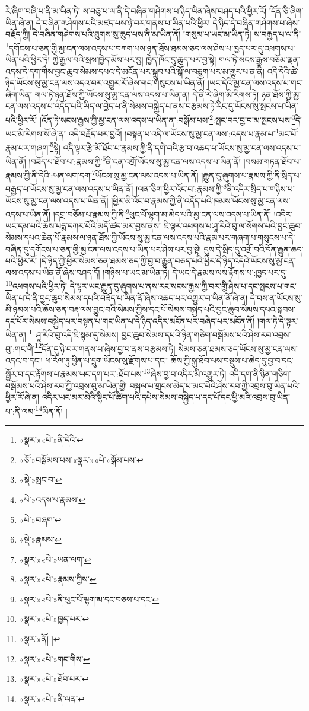 རེ་ཞིག་བཞི་པ་ནི་མ་ཡིན་ཏེ། ས་བཅུ་པ་ལ་ནི་དེ་བཞིན་གཤེགས་པ་ཉིད་ཡིན་ཞེས་བཤད་པའི་ཕྱིར་རོ། །དོན་ཅི་ཞིག་ཡིན་ཞེ་ན། དེ་བཞིན་གཤེགས་པའི་མཛད་པས་ཉེ་བར་གནས་པ་ཡིན་པའི་ཕྱིར། དེ་ཉིད་དེ་བཞིན་གཤེགས་པ་ཞེས་བརྗོད་ཀྱི། དེ་བཞིན་གཤེགས་པའི་ཐུགས་སུ་ཆུད་པས་ནི་མ་ཡིན་ནོ། །གསུམ་པ་ཡང་མ་ཡིན་ཏེ། ས་བརྒྱད་པ་ལ་ནི་\footnote{«སྣར་»«པེ་»ནི་དེའི་}དགོངས་པ་ཅན་གྱི་མྱ་ངན་ལས་འདས་པ་བཀག་པས་ཉན་ཐོས་ཐམས་ཅད་ལས་ཤེས་པ་ཁྱད་པར་དུ་འཕགས་པ་ཡིན་པའི་ཕྱིར་ཏེ། ཀྱེ་རྒྱལ་བའི་སྲས་ཁྱེད་མོས་པར་བྱ། ཁྱེད་ཁོང་དུ་ཆུད་པར་བྱ་སྟེ། གལ་ཏེ་སངས་རྒྱས་བཅོམ་ལྡན་འདས་དེ་དག་གིས་བྱང་ཆུབ་སེམས་དཔའ་དེ་མངོན་པར་སྒྲུབ་པའི་སྒོ་ལ་བཅུག་པར་མ་གྱུར་པ་ན་ནི། འདི་དེའི་ཚེ་ཉིད་ཡོངས་སུ་མྱ་ངན་ལས་འདའ་བར་འགྱུར་རོ་ཞེས་གང་གསུངས་པ་ཡིན་ནོ། །ཡང་དེའི་མྱ་ངན་ལས་འདས་པ་གང་ཞིག་ཡིན། གལ་ཏེ་ཉན་ཐོས་ཀྱི་ཡོངས་སུ་མྱ་ངན་ལས་འདས་པ་ཡིན་ན། དེ་ནི་རེ་ཞིག་མི་རིགས་ཏེ། ཉན་ཐོས་ཀྱི་མྱ་ངན་ལས་འདས་པ་འདོད་པའི་ཡིད་ལ་བྱེད་པ་ནི་སེམས་བསྐྱེད་པ་ནས་བརྩམས་ཏེ་རིང་དུ་ཡོངས་སུ་སྤངས་པ་ཡིན་པའི་ཕྱིར་རོ། །འོན་ཏེ་སངས་རྒྱས་ཀྱི་མྱ་ངན་ལས་འདས་པ་ཡིན་ན་:བསྒོམ་པས་\footnote{«ཅོ་»བསྒོམས་པས་«སྣར་»«པེ་»སྒོམ་པས་}:སྤང་བར་བྱ་བ་མ་སྤངས་པས་\footnote{«སྡེ་»སྤང་བ་}དེ་ཡང་མི་རིགས་སོ་ཞེ་ན། འདི་བརྗོད་པར་བྱའོ། །བསྟན་པ་འདི་ལ་ཡོངས་སུ་མྱ་ངན་ལས་:འདས་པ་རྣམ་པ་\footnote{«པེ་»འདས་པ་རྣམས་}མང་པོ་རྣམ་པར་གཞག་\footnote{«པེ་»བཞག་}སྟེ། འདི་ལྟར་རྩེ་མོ་ཐོབ་པ་རྣམས་ཀྱི་ནི་དགེ་བའི་རྩ་བ་འཆད་པ་ཡོངས་སུ་མྱ་ངན་ལས་འདས་པ་ཡིན་ནོ། །བཟོད་པ་ཐོབ་པ་:རྣམས་ཀྱི་\footnote{«སྡེ་»རྣམས་}ནི་ངན་འགྲོ་ཡོངས་སུ་མྱ་ངན་ལས་འདས་པ་ཡིན་ནོ། །བསམ་གཏན་ཐོབ་པ་རྣམས་ཀྱི་ནི་དེའི་:ཡན་ལག་དག་\footnote{«སྣར་»«པེ་»ཡན་ལག་}ཡོངས་སུ་མྱ་ངན་ལས་འདས་པ་ཡིན་ནོ། །རྒྱུན་དུ་ཞུགས་པ་རྣམས་ཀྱི་ནི་སྲིད་པ་བརྒྱད་པ་ཡོངས་སུ་མྱ་ངན་ལས་འདས་པ་ཡིན་ནོ། །ལན་ཅིག་ཕྱིར་འོང་བ་:རྣམས་ཀྱི་\footnote{«སྣར་»«པེ་»རྣམས་ཀྱིས་}ནི་འདིར་སྲིད་པ་གཉིས་པ་ཡོངས་སུ་མྱ་ངན་ལས་འདས་པ་ཡིན་ནོ། །ཕྱིར་མི་འོང་བ་རྣམས་ཀྱི་ནི་འདོད་པའི་ཁམས་ཡོངས་སུ་མྱ་ངན་ལས་འདས་པ་ཡིན་ནོ། །དགྲ་བཅོམ་པ་རྣམས་ཀྱི་ནི་\footnote{«སྣར་»«པེ་»ནི་ཕུང་པོ་ལྷག་མ་དང་བཅས་པ་དང་}ཕུང་པོ་ལྷག་མ་མེད་པའི་མྱ་ངན་ལས་འདས་པ་ཡིན་ནོ། །འདིར་ཡང་དམ་པའི་ཆོས་པདྨ་དཀར་པོའི་མདོ་ཚད་མར་བྱས་ནས། ཇི་ལྟར་འཕགས་པ་ཤཱ་རིའི་བུ་ལ་སོགས་པའི་བྱང་ཆུབ་སེམས་དཔའ་ཆེན་པོ་རྣམས་ལ་ཉན་ཐོས་ཀྱི་ཡོངས་སུ་མྱ་ངན་ལས་འདས་པའི་རྣམ་པར་གཞག་པ་གསུངས་པ་དེ་བཞིན་དུ་དགོངས་པ་ཅན་གྱི་མྱ་ངན་ལས་འདས་པ་ཡིན་པར་ཤེས་པར་བྱ་སྟེ། དུས་དེ་སྲིད་དུ་འགྲོ་བའི་དོན་རྒྱུན་ཆད་པའི་ཕྱིར་རོ། །དེ་ཉིད་ཀྱི་ཕྱིར་སེམས་ཅན་ཐམས་ཅད་ཀྱི་བྱ་བ་རྒྱུན་བཅད་པའི་ཕྱིར་དེ་ཉིད་འདིའི་ཡོངས་སུ་མྱ་ངན་ལས་འདས་པ་ཡིན་ནོ་ཞེས་བཤད་དོ། །གཉིས་པ་ཡང་མ་ཡིན་ཏེ། དེ་ཡང་དེ་རྣམས་ལས་རྟོགས་པ་:ཁྱད་པར་དུ་\footnote{«སྣར་»«པེ་»ཁྱད་པར་}འཕགས་པའི་ཕྱིར་ཏེ། དེ་ལྟར་ཡང་རྒྱུན་དུ་ཞུགས་པ་ནས་རང་སངས་རྒྱས་ཀྱི་བར་གྱི་ཤེས་པ་དང་སྤངས་པ་གང་ཡིན་པ་དེ་ནི་བྱང་ཆུབ་སེམས་དཔའི་བཟོད་པ་ཡིན་ནོ་ཞེས་འཆད་པར་འགྱུར་བ་ཡིན་ནོ་ཞེ་ན། དེ་བས་ན་ཡོངས་སུ་མི་ཉམས་པའི་ཆོས་ཅན་བརྡ་ལས་བྱུང་བའི་སེམས་ཀྱིས་དང་པོ་སེམས་བསྐྱེད་པའི་བྱང་ཆུབ་སེམས་དཔའ་སྐབས་དང་པོར་སེམས་བསྐྱེད་པར་བསྟན་པ་གང་ཡིན་པ་དེ་ཉིད་འདིར་མངོན་པར་བཞེད་པར་མངོན་ནོ། །གལ་ཏེ་དེ་ལྟར་ཡིན་ན། \footnote{«སྣར་»ནོ། ། }ཤཱ་རིའི་བུ་འདི་ཇི་སྙམ་དུ་སེམས། བྱང་ཆུབ་སེམས་དཔའི་ཉིན་གཅིག་བསྒོམས་པའི་ཤེས་རབ་འབྲས་བུ་:གང་གི་\footnote{«སྣར་»«པེ་»གང་གིས་}དོན་དུ་ཉེ་བར་གནས་པ་ཞེས་བྱ་བ་ནས་བརྩམས་ཏེ། སེམས་ཅན་ཐམས་ཅད་ཡོངས་སུ་མྱ་ངན་ལས་འདའ་བ་དང་། ཕ་རོལ་ཏུ་ཕྱིན་པ་དྲུག་ཡོངས་སུ་རྫོགས་པ་དང་། ཆོས་ཀྱི་སྐུ་ཐོབ་པས་བསྡུས་པ་ཆེད་དུ་བྱ་བ་དང་སྦྱོར་བ་དང་རྟོགས་པ་རྣམས་ཡང་དག་པར་:ཐོབ་པས་\footnote{«སྣར་»«པེ་»ཐོབ་པར་}ཞེས་བྱ་བ་འདིར་མི་འགྱུར་ཏེ། འདི་དག་ནི་ཉིན་གཅིག་བསྒོམས་པའི་ཤེས་རབ་ཀྱི་འབྲས་བུ་མ་ཡིན་གྱི། བསྐལ་པ་གྲངས་མེད་པ་མང་པོའི་ཤེས་རབ་ཀྱི་འབྲས་བུ་ཡིན་པའི་ཕྱིར་རོ་ཞེ་ན། འདིར་ཡང་མར་མེའི་སྙིང་པོ་ཚིག་པའི་དཔེས་སེམས་བསྐྱེད་པ་དང་པོ་དང་ཕྱི་མའི་འབྲས་བུ་ཡིན་པ་:ནི་ལམ་\footnote{«སྣར་»«པེ་»ནི་ལན་}ཡིན་ནོ། །
